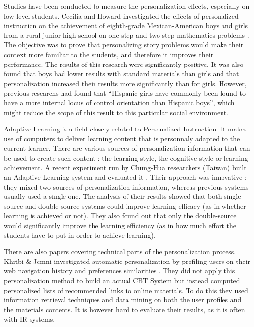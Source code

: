 \documentclass[a4paper,12pt]{article}
\begin{document}
Studies have been conducted to measure the personalization effects, especially on low level students. Cecilia and Howard investigated the effects of personalized instruction on the achievement of eighth-grade Mexican-American boys and girls from a rural junior high school on one-step and two-step mathematics problems \cite{lopez_hispanic}. The objective was to prove that personalizing story problems would make their context more familiar to the students, and therefore it improves their performance. The results of this research were significantly positive. It was also found that boys had lower results with standard materials than girls and that personalization increased their results more significantly than for girls. However, previous researchs had found that “Hispanic girls have commonly been found to have a more internal locus of control orientation than Hispanic boys”, which might reduce the scope of this result to this particular social environment.

Adaptive Learning is a field closely related to Personalized Instruction. It makes use of computers to deliver learning content that is personnaly adapted to the current learner. There are various sources of personalization information that can be used to create such content : the learning style, the cognitive style or learning achievement. A recent experiment run by Chung-Hua researchers (Taiwan) built an Adaptive Learning system and evaluated it \cite{tseng_two_sources}. Their approach was innovative : they mixed two sources of personalization information, whereas previous systems usually used a single one. The analysis of their results showed that both single-source and double-source systems could improve learning efficacy (as in whether learning is achieved or not). They also found out that only the double-source would significantly improve the learning efficiency (as in how much effort the students have to put in order to achieve learning).

There are also papers covering technical parts of the personalization process. Khribi \& Jemni investigated automatic personalization by profiling users on their web navigation history and preferences similarities \cite{khribi_recommendations}. They did not apply this personalization method to build an actual CBT System but instead computed personalized lists of recommended links to online materials. To do this they used information retrieval techniques and data mining on both the user profiles and the materials contents. It is however hard to evaluate their results, as it is often with IR systems.
\end{document}
